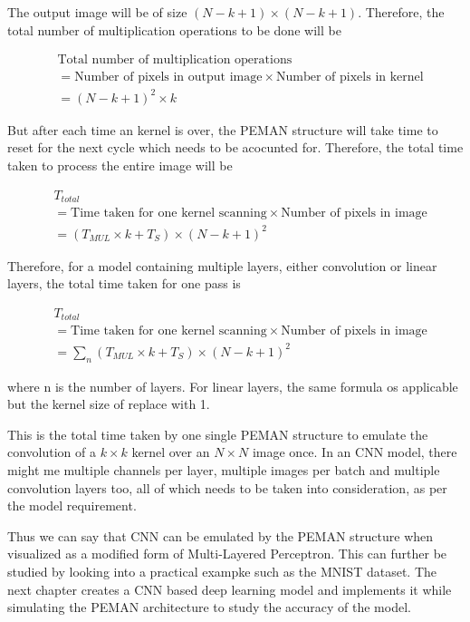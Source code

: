 \documentclass[wide]{adonis}
\begin{document}
The output image will be of size $(N - k + 1) \times (N - k + 1)$. Therefore, the total number of multiplication operations to be done will be

\begin{equation}
	\label{eqn:total_mul_ops}
	\begin{split}
		&\text{Total number of multiplication operations} \\
		&= \text{Number of pixels in output image} \times \text{Number of pixels in kernel} \\
		&= (N - k + 1)^2 \times k
	\end{split}
\end{equation}

But after each time an kernel is over, the PEMAN structure will take time to reset for the next cycle which needs to be acocunted for. Therefore, the total time taken to process the entire image will be

\begin{equation}
	\label{eqn:total_time}
	\begin{split}
		&T_{total} \\
		&= \text{Time taken for one kernel scanning} \times \text{Number of pixels in image} \\
		&= (T_{MUL} \times k + T_S) \times (N - k + 1)^2
	\end{split}
\end{equation}

Therefore, for a model containing multiple layers, either convolution or linear layers, the total time taken for one pass is

\begin{equation}
	\label{eqn:total_time_model}
	\begin{split}
		&T_{total} \\
		&= \text{Time taken for one kernel scanning} \times \text{Number of pixels in image} \\
		&= \sum_{n} (T_{MUL} \times k + T_S) \times (N - k + 1)^2
	\end{split}
\end{equation}

where n is the number of layers. For linear layers, the same formula os applicable but the kernel size of replace with 1.

This is the total time taken by one single PEMAN structure to emulate the convolution of a $k \times k$ kernel over an $N  \times N$ image once. In an CNN model, there might me multiple channels per layer, multiple images per batch and multiple convolution layers too, all of which needs to be taken into consideration, as per the model requirement.

Thus we can say that CNN can be emulated by the PEMAN structure when visualized as a modified form of Multi-Layered Perceptron. This can further be studied by looking into a practical exampke such as the MNIST dataset. The next chapter creates a CNN based deep learning model and implements it while simulating the PEMAN architecture to study the accuracy of the model.
\end{document}
